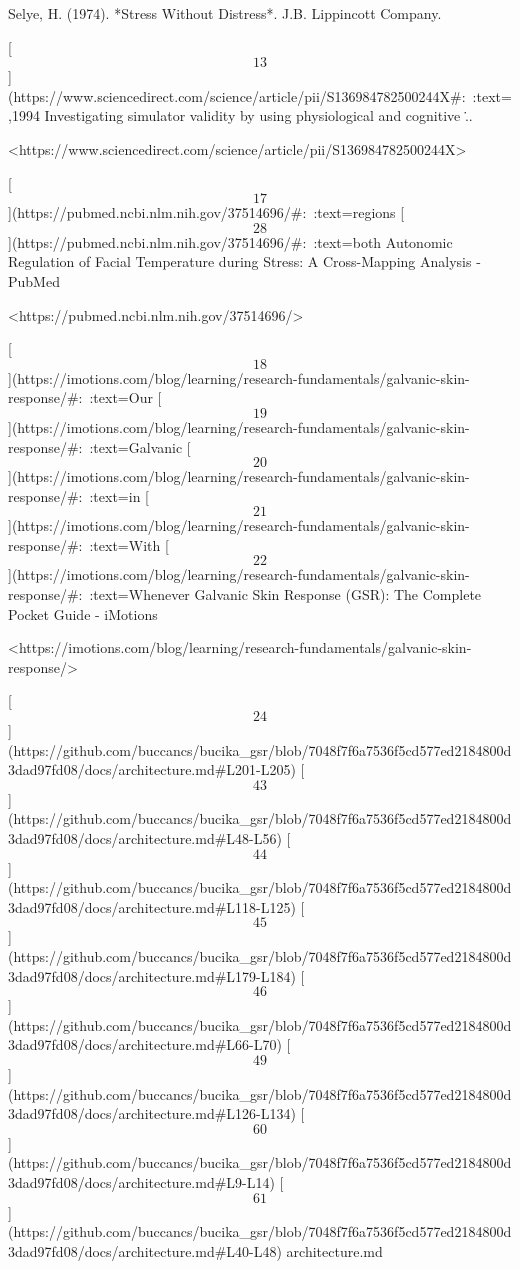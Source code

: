 \documentclass[12pt,a4paper]{article}
\begin{document}
Selye, H. (1974). *Stress Without Distress*. J.B. Lippincott Company.

[\[13\]](https://www.sciencedirect.com/science/article/pii/S136984782500244X#:~:text=,1994%
Investigating simulator validity by using physiological and cognitive
\...

<https://www.sciencedirect.com/science/article/pii/S136984782500244X>

[\[17\]](https://pubmed.ncbi.nlm.nih.gov/37514696/#:~:text=regions%
[\[28\]](https://pubmed.ncbi.nlm.nih.gov/37514696/#:~:text=both%
Autonomic Regulation of Facial Temperature during Stress: A
Cross-Mapping Analysis - PubMed

<https://pubmed.ncbi.nlm.nih.gov/37514696/>

[\[18\]](https://imotions.com/blog/learning/research-fundamentals/galvanic-skin-response/#:~:text=Our%
[\[19\]](https://imotions.com/blog/learning/research-fundamentals/galvanic-skin-response/#:~:text=Galvanic%
[\[20\]](https://imotions.com/blog/learning/research-fundamentals/galvanic-skin-response/#:~:text=in%
[\[21\]](https://imotions.com/blog/learning/research-fundamentals/galvanic-skin-response/#:~:text=With%
[\[22\]](https://imotions.com/blog/learning/research-fundamentals/galvanic-skin-response/#:~:text=Whenever%
Galvanic Skin Response (GSR): The Complete Pocket Guide - iMotions

<https://imotions.com/blog/learning/research-fundamentals/galvanic-skin-response/>

[\[24\]](https://github.com/buccancs/bucika_gsr/blob/7048f7f6a7536f5cd577ed2184800d3dad97fd08/docs/architecture.md#L201-L205)
[\[43\]](https://github.com/buccancs/bucika_gsr/blob/7048f7f6a7536f5cd577ed2184800d3dad97fd08/docs/architecture.md#L48-L56)
[\[44\]](https://github.com/buccancs/bucika_gsr/blob/7048f7f6a7536f5cd577ed2184800d3dad97fd08/docs/architecture.md#L118-L125)
[\[45\]](https://github.com/buccancs/bucika_gsr/blob/7048f7f6a7536f5cd577ed2184800d3dad97fd08/docs/architecture.md#L179-L184)
[\[46\]](https://github.com/buccancs/bucika_gsr/blob/7048f7f6a7536f5cd577ed2184800d3dad97fd08/docs/architecture.md#L66-L70)
[\[49\]](https://github.com/buccancs/bucika_gsr/blob/7048f7f6a7536f5cd577ed2184800d3dad97fd08/docs/architecture.md#L126-L134)
[\[60\]](https://github.com/buccancs/bucika_gsr/blob/7048f7f6a7536f5cd577ed2184800d3dad97fd08/docs/architecture.md#L9-L14)
[\[61\]](https://github.com/buccancs/bucika_gsr/blob/7048f7f6a7536f5cd577ed2184800d3dad97fd08/docs/architecture.md#L40-L48)
architecture.md
\end{document}

